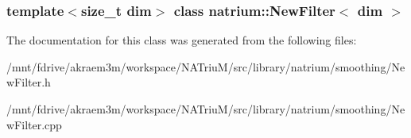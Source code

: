 \subsubsection*{template$<$size\_\-t dim$>$ class natrium::NewFilter$<$ dim $>$}



The documentation for this class was generated from the following files:\begin{DoxyCompactItemize}
\item 
/mnt/fdrive/akraem3m/workspace/NATriuM/src/library/natrium/smoothing/NewFilter.h\item 
/mnt/fdrive/akraem3m/workspace/NATriuM/src/library/natrium/smoothing/NewFilter.cpp\end{DoxyCompactItemize}

